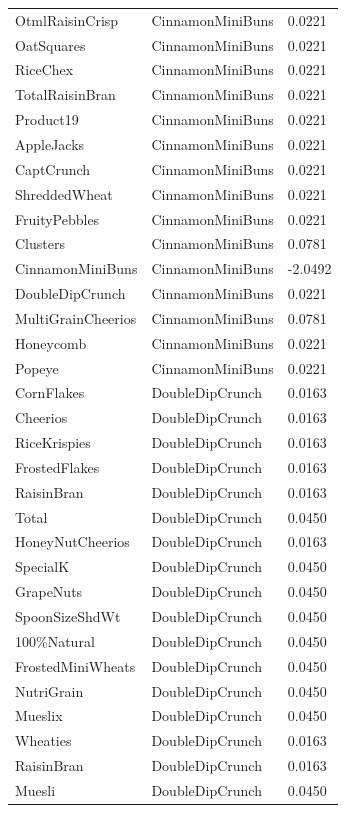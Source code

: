 \begin{table}[!htbp]
\begin{tabular}{lll}
OtmlRaisinCrisp & CinnamonMiniBuns & 0.0221
\\
OatSquares & CinnamonMiniBuns & 0.0221
\\
RiceChex & CinnamonMiniBuns & 0.0221
\\
TotalRaisinBran & CinnamonMiniBuns & 0.0221
\\
Product19 & CinnamonMiniBuns & 0.0221
\\
AppleJacks & CinnamonMiniBuns & 0.0221
\\
CaptCrunch & CinnamonMiniBuns & 0.0221
\\
ShreddedWheat & CinnamonMiniBuns & 0.0221
\\
FruityPebbles & CinnamonMiniBuns & 0.0221
\\
Clusters & CinnamonMiniBuns & 0.0781
\\
CinnamonMiniBuns & CinnamonMiniBuns & -2.0492
\\
DoubleDipCrunch & CinnamonMiniBuns & 0.0221
\\
MultiGrainCheerios & CinnamonMiniBuns & 0.0781
\\
Honeycomb & CinnamonMiniBuns & 0.0221
\\
Popeye & CinnamonMiniBuns & 0.0221
\\
CornFlakes & DoubleDipCrunch & 0.0163
\\
Cheerios & DoubleDipCrunch & 0.0163
\\
RiceKrispies & DoubleDipCrunch & 0.0163
\\
FrostedFlakes & DoubleDipCrunch & 0.0163
\\
RaisinBran & DoubleDipCrunch & 0.0163
\\
Total & DoubleDipCrunch & 0.0450
\\
HoneyNutCheerios & DoubleDipCrunch & 0.0163
\\
SpecialK & DoubleDipCrunch & 0.0450
\\
GrapeNuts & DoubleDipCrunch & 0.0450
\\
SpoonSizeShdWt & DoubleDipCrunch & 0.0450
\\
100\%Natural & DoubleDipCrunch & 0.0450
\\
FrostedMiniWheats & DoubleDipCrunch & 0.0450
\\
NutriGrain & DoubleDipCrunch & 0.0450
\\
Mueslix & DoubleDipCrunch & 0.0450
\\
Wheaties & DoubleDipCrunch & 0.0163
\\
RaisinBran & DoubleDipCrunch & 0.0163
\\
Muesli & DoubleDipCrunch & 0.0450
\\

\end{tabular}
\end{table}
